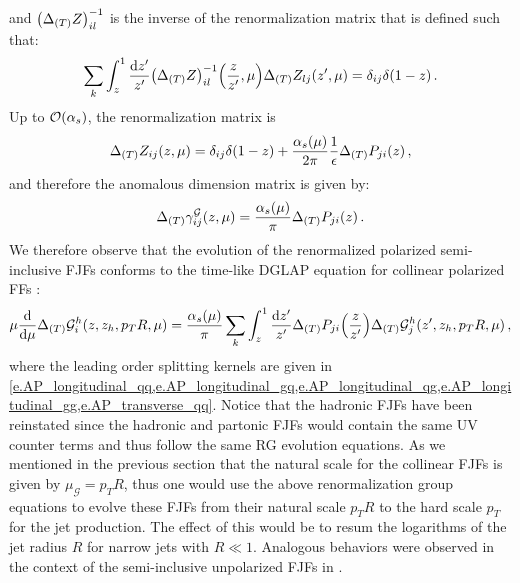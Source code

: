 \documentclass[a4paper, 11 pt]{article}
\begin{document}
and $\pqty{\Delta _{\pqty{T}} Z}_{il}^{-1}$ is the inverse of the renormalization matrix that is defined such that:
\begin{equation}
\sum _k \int _z^1 \frac{\dd{z'}}{z'}
\pqty{\Delta _{\pqty{T}} Z}_{il}^{-1} \pqty{\frac{z}{z'}, \mu}
\Delta _{\pqty{T}} Z_{lj} \pqty{z', \mu}
=
\delta _{ij} \delta \pqty{1 - z}
\, .
\end{equation}
Up to $\order{\alpha _s}$, the renormalization matrix is
\begin{equation}
\Delta _{\pqty{T}} Z_{ij} \pqty{z, \mu}
=
\delta _{ij} \delta \pqty{1 - z}
+
\frac{\alpha _s \pqty{\mu}}{2 \pi} \frac{1}{\epsilon}
\Delta _{\pqty{T}} P_{ji} \pqty{z}
\, ,
\end{equation}
and therefore the anomalous dimension matrix is given by:
\begin{equation}
\Delta _{\pqty{T}}\gamma _{ij}^{ \mathcal{G}} \pqty{z, \mu}
=
\frac{\alpha _s \pqty{\mu}}{\pi}
\Delta _{\pqty{T}} P_{ji} \pqty{z}
\, .
\end{equation}
We therefore observe that the evolution of the renormalized polarized semi-inclusive FJFs conforms to the time-like DGLAP equation for collinear polarized FFs \cite{Altarelli:1977zs}:
\begin{equation}
\mu \frac{\dd{}}{\dd{\mu}}
\Delta _{\pqty{T}} \mathcal{G} _i^h \pqty{z, z_h, p_TR,  \mu}
=
\frac{\alpha _s \pqty{\mu}}{\pi}
\sum _k \int _z^1 \frac{\dd{z'}}{z'}
\Delta _{\pqty{T}} P_{ji} \pqty{\frac{z}{z'}}
\Delta _{\pqty{T}} \mathcal{G} _j^h \pqty{z', z_h, p_TR,  \mu}
\, ,
\end{equation}
where the leading order splitting kernels are given in \cref{e.AP_longitudinal_qq,e.AP_longitudinal_gq,e.AP_longitudinal_qg,e.AP_longitudinal_gg,e.AP_transverse_qq}.
Notice that the hadronic FJFs have been reinstated since the hadronic and partonic FJFs would contain the same UV counter terms and thus follow the same RG evolution equations.
As we mentioned in the previous section that the natural scale for the collinear FJFs is given by $\mu_{\mathscr{G}} = p_T R$, thus one would use the above renormalization group equations to evolve these FJFs from their natural scale $p_TR$ to the hard scale $p_T$ for the jet production.
The effect of this would be to resum the logarithms of the jet radius $R$ for narrow jets with $R \ll 1$.
Analogous behaviors were observed in the context of the semi-inclusive unpolarized FJFs in \cite{Kang:2016ehg}.
\end{document}
